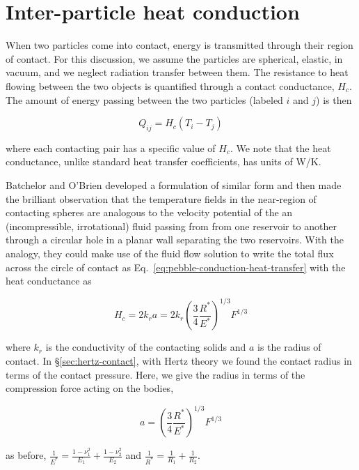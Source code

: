 \section{Inter-particle heat conduction}\label{sec:ht-pebble-conduction}

When two particles come into contact, energy is transmitted through their region of contact. For this discussion, we assume the particles are spherical, elastic, in vacuum, and we neglect radiation transfer between them. The resistance to heat flowing between the two objects is quantified through a contact conductance, $H_c$. The amount of energy passing between the two particles (labeled $i$ and $j$) is then

\begin{equation}\label{eq:pebble-conduction-heat-transfer}
	Q_{ij} = H_{c}(T_i - T_j)
\end{equation}

where each contacting pair has a specific value of $H_c$. We note that the heat conductance, unlike standard heat transfer coefficients, has units of \si{W/K}.

Batchelor and O'Brien\cite{Batchelor1977} developed a formulation of similar form and then made the brilliant observation that the temperature fields in the near-region of contacting spheres are analogous to the velocity potential of the an (incompressible, irrotational) fluid passing from from one reservoir to another through a circular hole in a planar wall separating the two reservoirs. With the analogy, they could make use of the fluid flow solution to write the total flux across the circle of contact as Eq.~\ref{eq:pebble-conduction-heat-transfer} with the heat conductance as

\begin{equation}\label{eq:batchelor-pebble-conductance}
	H_c = 2k_ra = 2k_r \left(\frac{3}{4}\frac{R^*}{E^*}\right)^{1/3}F^{1/3}
\end{equation}

where $k_r$ is the conductivity of the contacting solids and $a$ is the radius of contact. In \S\ref{sec:hertz-contact}, with Hertz theory we found the contact radius in terms of the contact pressure. Here, we give the radius in terms of the compression force acting on the bodies,

\begin{equation}
	a =  \left(\frac{3}{4}\frac{R^*}{E^*}\right)^{1/3}F^{1/3}	
\end{equation}

as before, $\frac{1}{E^*} = \frac{1-\nu_1^2}{E_1} + \frac{1-\nu_2^2}{E_2}$ and $\frac{1}{R^*} = \frac{1}{R_1} + \frac{1}{R_2}$. 

